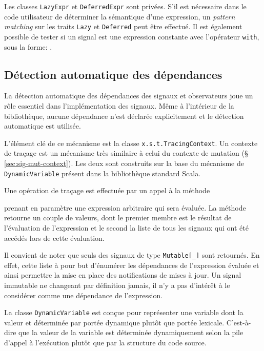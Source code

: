 Les classes \texttt{LazyExpr} et \texttt{DeferredExpr} sont privées. S'il est nécessaire dans le code utilisateur de déterminer la sémantique d'une expression, un \emph{pattern matching} sur les traits \texttt{Lazy} et \texttt{Deferred} peut être effectué. Il est également possible de tester si un signal est une expression constante avec l'opérateur \texttt{with}, sous la forme: .

\subsection{Détection automatique des dépendances}

La détection automatique des dépendances des signaux et observateurs joue un rôle essentiel dans l'implémentation des signaux. Même à l'intérieur de la bibliothèque, aucune dépendance n'est déclarée explicitement et le détection automatique est utilisée.

L'élément clé de ce mécanisme est la classe \texttt{x.s.t.TracingContext}. Un contexte de traçage est un mécanisme très similaire à celui du contexte de mutation (§ \ref{sec:sig-mut-context}). Les deux sont construits sur la base du mécanisme de \texttt{DynamicVariable} présent dans la bibliothèque standard Scala.

Une opération de traçage est effectuée par un appel à la méthode
\begin{center}
\end{center}
prenant en paramètre une expression arbitraire qui sera évaluée. La méthode retourne un couple de valeurs, dont le premier membre est le résultat de l'évaluation de l'expression et le second la liste de tous les signaux qui ont été accédés lors de cette évaluation.

Il convient de noter que seuls des signaux de type \texttt{Mutable[\_]} sont retournés. En effet, cette liste à pour but d'énumérer les dépendances de l'expression évaluée et ainsi permettre la mise en place des notifications de mises à jour. Un signal immutable ne changeant par définition jamais, il n'y a pas d'intérêt à le considérer comme une dépendance de l'expression.

La classe \texttt{DynamicVariable} est conçue pour représenter une variable dont la valeur et déterminée par portée dynamique plutôt que portée lexicale. C'est-à-dire que la valeur de la variable est déterminée dynamiquement selon la pile d'appel à l'exécution plutôt que par la structure du code source.

